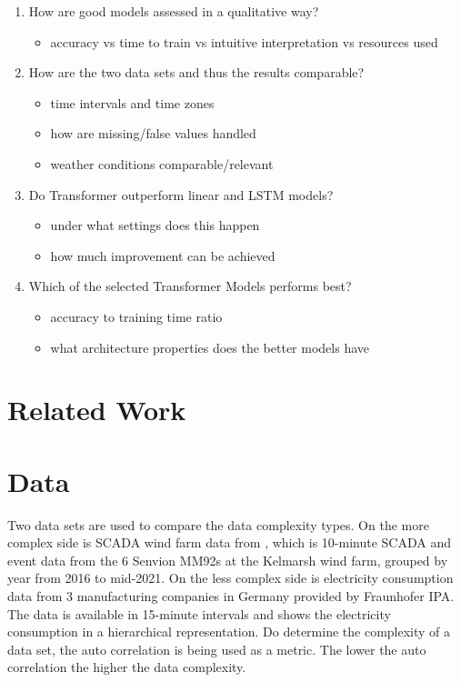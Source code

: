 \documentclass{article}
\begin{document}
\begin{enumerate}
    \item How are good models assessed in a qualitative way?
        \begin{itemize}
            \item accuracy vs time to train vs intuitive interpretation vs resources used
        \end{itemize}
    \item How are the two data sets and thus the results comparable?
        \begin{itemize}
            \item time intervals and time zones
            \item how are missing/false values handled
            \item weather conditions comparable/relevant
        \end{itemize}
    \item Do Transformer outperform linear and LSTM models?
        \begin{itemize}
            \item under what settings does this happen
            \item how much improvement can be achieved
        \end{itemize}
    \item Which of the selected Transformer Models performs best?
        \begin{itemize}
            \item accuracy to training time ratio
            \item what architecture properties does the better models have
        \end{itemize}
\end{enumerate}

\section{Related Work}

\section{Data}

Two data sets are used to compare the data complexity types. On the more complex side is SCADA wind farm data from \cite{Windpark_Data_1}, which is 10-minute SCADA and event data from the 6 Senvion MM92s at the Kelmarsh wind farm, grouped by year from 2016 to mid-2021. On the less complex side is electricity consumption data from 3 manufacturing companies in Germany provided by Fraunhofer IPA. The data is available in 15-minute intervals and shows the electricity consumption in a hierarchical representation.
Do determine the complexity of a data set, the auto correlation is being used as a metric. The lower the auto correlation the higher the data complexity. 
\end{document}
